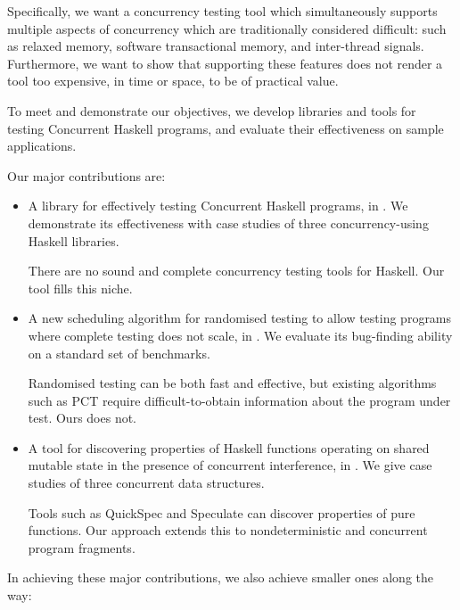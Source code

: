 Specifically, we want a concurrency testing tool which simultaneously
supports multiple aspects of concurrency which are traditionally
considered difficult: such as relaxed memory, software transactional
memory, and inter-thread signals.  Furthermore, we want to show that
supporting these features does not render a tool too expensive, in
time or space, to be of practical value.

To meet and demonstrate our objectives, we develop libraries and tools
for testing Concurrent Haskell programs, and evaluate their
effectiveness on sample applications.

Our major contributions are:

\begin{itemize}
\item A library for effectively testing Concurrent Haskell programs,
  in .  We demonstrate its effectiveness with case
  studies of three concurrency-using Haskell libraries.

  There are no sound and complete concurrency testing tools for
  Haskell.  Our tool fills this niche.
\item A new scheduling algorithm for randomised testing to allow
  testing programs where complete testing does not scale, in
  .  We evaluate its bug-finding ability on a
  standard set of benchmarks.

  Randomised testing can be both fast and effective, but existing
  algorithms such as PCT \parencite{burckhardt2010} require
  difficult-to-obtain information about the program under test.  Ours
  does not.
\item A tool for discovering properties of Haskell functions operating
  on shared mutable state in the presence of concurrent interference,
  in .  We give case studies of three concurrent data
  structures.

  Tools such as QuickSpec \parencite{smallbone2017} and Speculate
  \parencite{braquehais2017} can discover properties of pure
  functions.  Our approach extends this to nondeterministic and
  concurrent program fragments.
\end{itemize}

In achieving these major contributions, we also achieve smaller ones
along the way:

